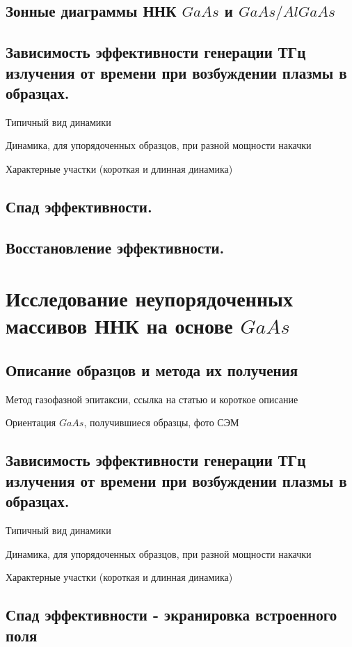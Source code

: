 \documentclass[a4paper,14pt,russian]{extreport}
\begin{document}
			\subsection{Зонные диаграммы ННК $GaAs$ и $GaAs/AlGaAs$}
			\subsection{Зависимость эффективности генерации ТГц излучения от времени при возбуждении плазмы в образцах.}
				Типичный вид динамики\par
				Динамика, для упорядоченных образцов,
				при разной мощности накачки\par
				Характерные участки (короткая и длинная
				динамика)\par
			\subsection{Спад эффективности.}
			\subsection{Восстановление эффективности.}
		\section{Исследование неупорядоченных массивов ННК на основе $GaAs$}
			\subsection{Описание образцов и метода их получения}
				Метод газофазной эпитаксии, ссылка на
				статью и короткое описание\par
				Ориентация $GaAs$, получившиеся образцы,
				фото СЭМ
			\newpage
			\subsection{Зависимость эффективности генерации ТГц излучения от времени при возбуждении плазмы в образцах.}
				Типичный вид динамики\par
				Динамика, для упорядоченных образцов,
				при разной мощности накачки\par
				Характерные участки (короткая и длинная
				динамика)\par
			\subsection{Спад эффективности - экранировка встроенного поля}
\end{document}
